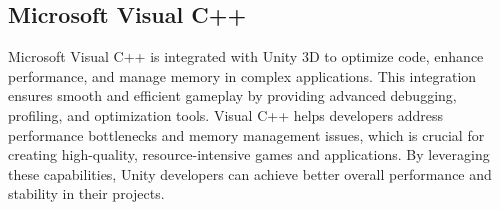 \subsection{Microsoft Visual C++}
Microsoft Visual C++ is integrated with Unity 3D to optimize code, enhance performance, and manage memory in complex applications. This integration ensures smooth and efficient gameplay by providing advanced debugging, profiling, and optimization tools. Visual C++ helps developers address performance bottlenecks and memory management issues, which is crucial for creating high-quality, resource-intensive games and applications. By leveraging these capabilities, Unity developers can achieve better overall performance and stability in their projects.
